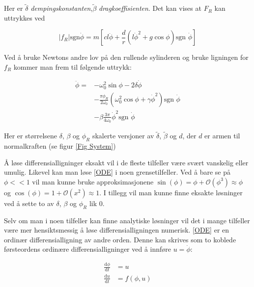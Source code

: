 \documentclass[5p]{elsarticle}
\newcommand{\dd}[2]{\frac{\mathrm{d}{#1}}{\mathrm{d}{#2}}} %
\begin{document}
Her er \(\tilde{\delta}\) \textit{dempingskonstanten},\(\tilde{\beta}\) \textit{dragkoeffisienten}.
Det kan vises at \(F_R\) kan uttrykkes ved

\begin{equation}
	|f_R|\text{sgn}\dot{\phi} =
	m\left[
		cl\ddot{\phi}+\frac{d}{r}
		\left(l\dot{\phi}^2 + g\cos\phi\right)
		\text{sgn }\dot{\phi}
	\right]
\end{equation}

Ved å bruke Newtons andre lov på den rullende sylinderen 
og bruke ligningen for \(f_R\) kommer man frem til følgende uttrykk:

\begin{equation}
	\begin{split}
		\label{ODE}	
		\ddot{\phi} = 	
		&- \omega_0^2\sin\phi - 2\delta\dot{\phi}	\\
		&- \frac{\pi\phi_R}{2\omega_0}
		\left(\omega_0^2\cos\phi + \gamma\dot{\phi}^2\right) \text{sgn } \dot{\phi} \\
		&- \beta \frac{3\pi}{4\omega_0}\dot{\phi}^2\text{sgn }\dot{\phi} 
	\end{split}
\end{equation}

Her er størrelsene \(\delta\), \(\beta\) og \(\phi_R\) skalerte versjoner av 
\(\tilde{\delta}\), \(\tilde{\beta}\) og \(d\), der \(d\) er armen til normalkraften (se figur \ref{Fig System})

Å løse differensialligninger eksakt vil i de fleste tilfeller være svært vanskelig eller umulig.
Likevel kan man løse \eqref{ODE} i noen grensetilfeller. Ved å bare se på \(\phi << 1\) vil man kunne
bruke approksimasjonene 
\(\sin(\phi) = \phi + \mathcal{O}(\phi^3) \approx \phi\) og 
\(\cos(\phi) = 1 + \mathcal{O}(x^2) \approx 1\).
I tillegg vil man kunne finne eksakte løsninger ved å sette to av \(\delta\), \(\beta\) og \(\phi_R\) lik 0.
\par
Selv om man i noen tilfeller kan finne analytiske løsninger 
vil det i mange tilfeller være mer hensiktsmessig å løse differensialligningen numerisk.
\eqref{ODE} er en ordinær differensialligning av andre orden. 
Denne kan skrives som to koblede førsteordens ordinære differensialligninger ved å innføre \(u = \dot{\phi}\):

\begin{subequations}
	\begin{align}
		\dd{\phi}{t} & = u \\
		\dd{u}{t}    & = f(\phi, u) \\
	\end{align}
\end{subequations}
\end{document}

